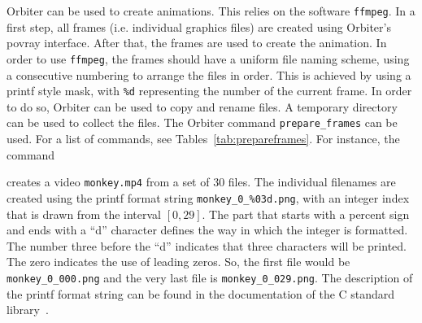 Orbiter can be used to create animations. 
This relies on the software \verb'ffmpeg'.
In a first step, all frames (i.e. individual graphics files) are created using Orbiter's povray interface. 
After that, the frames are used to create the animation. 
In order to use \verb'ffmpeg', the frames should have a uniform file naming scheme, 
using a consecutive numbering to arrange the files in order. 
This is achieved by using a printf style mask, with \verb'%d' representing the number of the current frame.
In order to do so, Orbiter can be used to copy and rename files. 
A temporary directory can be used to collect the files.
The Orbiter command \verb'prepare_frames' can be used. 
For a list of commands, see Tables~\ref{tab:prepareframes}.
For instance, the command 


creates a video \verb'monkey.mp4' from a set of 30 files. The individual 
filenames are created using the printf format string \verb'monkey_0_%03d.png', 
with an integer index that is drawn from the interval $[0,29].$ 
The part that starts with a percent sign and ends with a ``d'' character
defines the way in which the integer is formatted. 
The number three before the ``d'' indicates 
that three characters will be printed. 
The zero indicates the use of leading zeros.
So, the first file would be \verb'monkey_0_000.png' 
and the very last file is \verb'monkey_0_029.png'. 
The description of the printf format string can be found in the 
documentation of the C standard library~\cite{KernighanRitchie78}.
